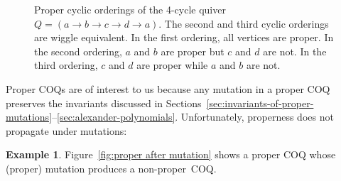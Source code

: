 \documentclass[11pt, letterpaper]{amsart}
\theoremstyle{definition}
\newtheorem{example}[theorem]{Example}
\numberwithin{equation}{section}
\begin{document}
{ %
\newcommand\cyclicLabels[5]{%
	\filldraw[black] (#4,#5)++(135:1cm) circle (2pt) node[above left=-1pt] {$a$} coordinate (a);
	\filldraw[black] (#4,#5)++(45:1cm) circle (2pt) node[above right=-1pt] {$#1$} coordinate (#1);
	\filldraw[black] (#4,#5)++(-45:1cm) circle (2pt) node[below right=-1pt] {$#2$} coordinate (#2);
	\filldraw[black] (#4,#5)++(-135:1cm) circle (2pt) node[below left=-1pt] {$#3$} coordinate (#3);
	\draw[black, dashed, decoration={markings, mark=at position 0 with {\arrow{<}}}, postaction={decorate}] (#4,#5) circle (1cm);
	\draw[black, -{stealth}, shorten >=3pt, shorten <= 3pt] (a) -- (b);
	\draw[black, -{stealth}, shorten >=3pt, shorten <= 3pt] (b) -- (c);
	\draw[black, -{stealth}, shorten >=3pt, shorten <= 3pt] (c) -- (d);
	\draw[black, -{stealth}, shorten >=3pt, shorten <= 3pt] (d) -- (a);
}

\begin{figure}[ht]
\vspace{5pt}
\caption{Proper cyclic orderings of the 4-cycle quiver $Q=(a \rightarrow b \rightarrow c \rightarrow d \rightarrow a)$.
The second and third cyclic orderings are wiggle equivalent.
In the first ordering, all vertices are proper. 
In the second ordering, $a$ and $b$ are proper but $c$ and $d$ are not.
In the third ordering, $c$ and $d$ are proper while $a$ and $b$ are not.}
\label{fig:proper-4-cycle orderings}
\end{figure}
} %



Proper COQs are of interest to us because any mutation in a proper COQ preserves the invariants discussed in
Sections~\ref{sec:invariants-of-proper-mutations}--\ref{sec:alexander-polynomials}. 
Unfortunately, properness does not propagate under mutations:

\begin{example}
\label{eg:proper-doesn't-propagate}
Figure~\ref{fig:proper after mutation} shows a proper COQ whose (proper) mutation produces a non-proper~COQ. 
\end{example}
\end{document}

